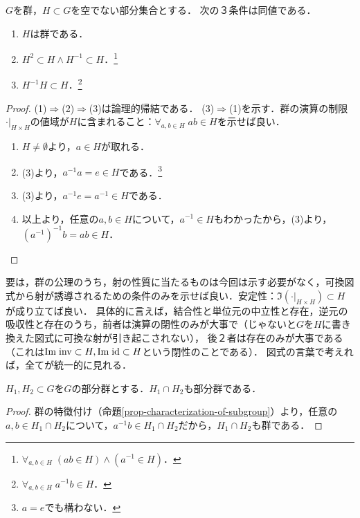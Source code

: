 \documentclass[uplatex,dvipdfmx]{jsreport}
\begin{document}
\begin{proposition}[部分群の特徴付け]\label{prop-characterization-of-subgroup}
    $G$を群，$H\subset G$を空でない部分集合とする．
    次の３条件は同値である．
    \begin{enumerate}
        \item $H$は群である．
        \item $H^2\subset H\land H^{-1}\subset H$．\footnote{$\forall_{a,b\in H}\;(ab\in H)\land(a^{-1}\in H)$．}
        \item $H^{-1}H\subset H$．\footnote{$\forall_{a,b\in H}\;a^{-1}b\in H$．}
    \end{enumerate}
\end{proposition}
\begin{proof}
    (1)$\Rightarrow$(2)$\Rightarrow$(3)は論理的帰結である．
    (3)$\Rightarrow$(1)を示す．群の演算の制限$\cdot|_{H\times H}$の値域が$H$に含まれること：$\forall_{a,b\in H}\;ab\in H$を示せば良い．
    \begin{enumerate}[1.]
        \item $H\ne\emptyset$より，$a\in H$が取れる．
        \item (3)より，$a^{-1}a=e\in H$である．\footnote{$a=e$でも構わない．}
        \item (3)より，$a^{-1}e=a^{-1}\in H$である．
        \item 以上より，任意の$a,b\in H$について，$a^{-1}\in H$もわかったから，(3)より，$(a^{-1})^{-1}b=ab\in H$．
    \end{enumerate}
\end{proof}
\begin{remarks}
    要は，群の公理のうち，射の性質に当たるものは今回は示す必要がなく，可換図式から射が誘導されるための条件のみを示せば良い．安定性：$\Im(\cdot|_{H\times H})\subset H$が成り立てば良い．
    具体的に言えば，結合性と単位元の中立性と存在，逆元の吸収性と存在のうち，前者は演算の閉性のみが大事で（じゃないと$G$を$H$に書き換えた図式に可換な射が引き起こされない），
    後２者は存在のみが大事である（これは$\mathrm{Im}\;\mathrm{inv}\subset H,\mathrm{Im}\;\mathrm{id}\subset H$という閉性のことである）．
    図式の言葉で考えれば，全てが統一的に見れる．
\end{remarks}

\begin{corollary}
    $H_1,H_2\subset G$を$G$の部分群とする．$H_1\cap H_2$も部分群である．
\end{corollary}
\begin{proof}
    群の特徴付け（命題\ref{prop-characterization-of-subgroup}）より，任意の$a,b\in H_1\cap H_2$について，$a^{-1}b\in H_1\cap H_2$だから，$H_1\cap H_2$も群である．
\end{proof}
\end{document}
